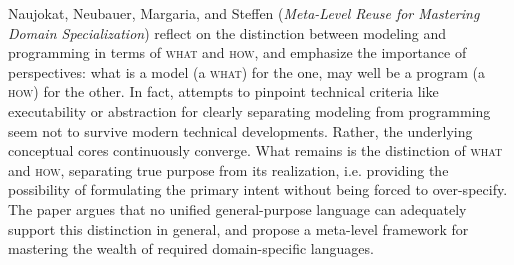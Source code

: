 


Naujokat, Neubauer, Margaria, and Steffen 
\cite{isola-2016-steffen} ({\em Meta-Level Reuse for Mastering 
Domain Specialization}) reflect on the distinction between modeling 
and programming in terms of {\textsc{what}}{} and {\textsc{how}}{}, 
and emphasize the importance of perspectives: what is a model (a 
{\textsc{what}}{}) for the one, may well be a program (a 
{\textsc{how}}{}) for the other. In fact, attempts to pinpoint 
technical criteria like executability or abstraction for clearly 
separating modeling from programming seem not to survive modern 
technical developments. Rather, the underlying conceptual cores 
continuously converge. 
What remains is the distinction of 
{\textsc{what}}{} and {\textsc{how}}{}, separating true purpose 
from its realization, i.e. providing the possibility of 
formulating the primary intent without being forced to 
over-specify. 
The paper 
argues that no unified general-purpose language can adequately 
support this distinction in general, and propose a meta-level 
framework for mastering the wealth of required domain-specific 
languages.